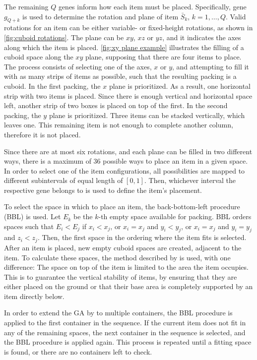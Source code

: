 The remaining $Q$ genes inform how each item must be placed. Specifically, gene $g_{Q+k}$ is used to determine the rotation and plane of item $\bar{S}_k$, $k = 1, \dots, Q$. Valid rotations for an item can be either variable- or fixed-height rotations, as shown in \cref{fig:cuboid rotations}. The plane can be $xy$, $xz$ or $yz$, and it indicates the axes along which the item is placed. \cref{fig:xy plane example} illustrates the filling of a cuboid space along the $xy$ plane, supposing that there are four items to place. The process consists of selecting one of the axes, $x$ or $y$, and attempting to fill it with as many strips of items as possible, such that the resulting packing is a cuboid. In the first packing, the $x$ plane is prioritized. As a result, one horizontal strip with two items is placed. Since there is enough vertical and horizontal space left, another strip of two boxes is placed on top of the first. In the second packing, the $y$ plane is prioritized. Three items can be stacked vertically, which leaves one. This remaining item is not enough to complete another column, therefore it is not placed.



Since there are at most six rotations, and each plane can be filled in two different ways, there is a maximum of 36 possible ways to place an item in a given space. In order to select one of the item configurations, all possibilities are mapped to different subintervals of equal length of $[0,1]$. Then, whichever interval the respective gene belongs to is used to define the item's placement.

To select the space in which to place an item, the back-bottom-left procedure (BBL) is used. Let $E_k$ be the $k$-th empty space available for packing. BBL orders spaces such that $E_i < E_j$ if $x_i < x_j$, or $x_i = x_j$ and $y_i < y_j$, or $x_i = x_j$ and $y_i = y_j$ and $z_i < z_j$. Then, the first space in the ordering where the item fits is selected. After an item is placed, new empty cuboid spaces are created, adjacent to the item. To calculate these spaces, the method described by \textcite{LAI1997} is used, with one difference: The space on top of the item is limited to the area the item occupies. This is to guarantee the vertical stability of items, by ensuring that they are either placed on the ground or that their base area is completely supported by an item directly below.

In order to extend the GA by \textcite{GONÇALVES2011} to multiple containers, the BBL procedure is applied to the first container in the sequence. If the current item does not fit in any of the remaining spaces, the next container in the sequence is selected, and the BBL procedure is applied again. This process is repeated until a fitting space is found, or there are no containers left to check.

